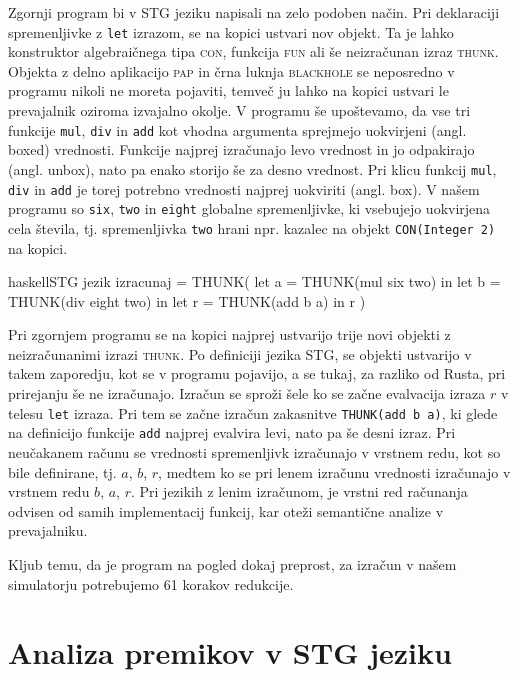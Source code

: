 Zgornji program bi v STG jeziku napisali na zelo podoben način. Pri deklaraciji spremenljivke z \texttt{let} izrazom, se na kopici ustvari nov objekt. Ta je lahko konstruktor algebraičnega tipa \textsc{con}, funkcija \textsc{fun} ali še neizračunan izraz \textsc{thunk}. Objekta z delno aplikacijo \textsc{pap} in črna luknja \textsc{blackhole} se neposredno v programu nikoli ne moreta pojaviti, temveč ju lahko na kopici ustvari le prevajalnik oziroma izvajalno okolje. V programu še upoštevamo, da vse tri funkcije \texttt{mul}, \texttt{div} in \texttt{add} kot vhodna argumenta sprejmejo uokvirjeni (angl. boxed) vrednosti. Funkcije najprej izračunajo levo vrednost in jo odpakirajo (angl. unbox), nato pa enako storijo še za desno vrednost. Pri klicu funkcij \texttt{mul}, \texttt{div} in \texttt{add} je torej potrebno vrednosti najprej uokviriti (angl. box). V našem programu so \texttt{six}, \texttt{two} in \texttt{eight} globalne spremenljivke, ki vsebujejo uokvirjena cela števila, tj. spremenljivka \texttt{two} hrani npr. kazalec na objekt \texttt{CON(Integer 2)} na kopici.

\begin{code-box}{haskell}{STG jezik \cmark}
izracunaj = THUNK(
    let a = THUNK(mul six two) in
    let b = THUNK(div eight two) in
    let r = THUNK(add b a) in
        r
)
\end{code-box}

Pri zgornjem programu se na kopici najprej ustvarijo trije novi objekti z neizračunanimi izrazi \textsc{thunk}. Po definiciji jezika STG, se objekti ustvarijo v takem zaporedju, kot se v programu pojavijo, a se tukaj, za razliko od Rusta, pri prirejanju še ne izračunajo. Izračun se sproži šele ko se začne evalvacija izraza $r$ v telesu \texttt{let} izraza. Pri tem se začne izračun zakasnitve \texttt{THUNK(add b a)}, ki glede na definicijo funkcije \texttt{add} najprej evalvira levi, nato pa še desni izraz. Pri neučakanem računu se vrednosti spremenljivk izračunajo v vrstnem redu, kot so bile definirane, tj. $a$, $b$, $r$, medtem ko se pri lenem izračunu vrednosti izračunajo v vrstnem redu $b$, $a$, $r$. Pri jezikih z lenim izračunom, je vrstni red računanja odvisen od samih implementacij funkcij, kar oteži semantične analize v prevajalniku.

Kljub temu, da je program na pogled dokaj preprost, za izračun v našem simulatorju potrebujemo 61 korakov redukcije.

\section{Analiza premikov v STG jeziku}
\label{sec:analiza-premikov}

